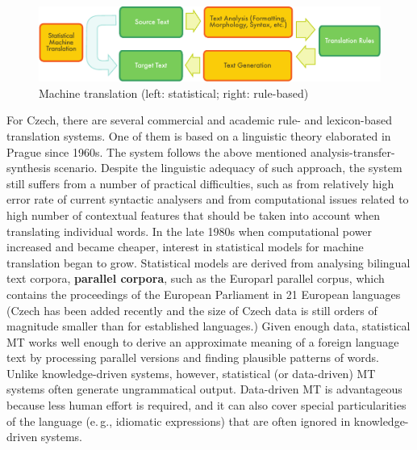\begin{multicols}{2}
\begin{figure}[htb]
  \center
  \includegraphics[width=\textwidth]{../_media/english/machine_translation}
  \caption{Machine translation (left: statistical; right: rule-based)}
\label{fig:mtarch_en}
\end{figure}

For Czech, there are several commercial and academic rule- and lexicon-based translation systems. One of them is based on a linguistic theory elaborated in Prague since 1960s. The system follows the above mentioned analysis-transfer-synthesis scenario. Despite the linguistic adequacy of such approach, the system still suffers from a number of practical difficulties, such as from relatively high error rate of current syntactic analysers and from computational issues related to high number of contextual features that should be taken into account when translating individual words.
In the late 1980s when computational power increased and became cheaper, interest in statistical models for machine translation began to grow. Statistical models are derived from analysing bilingual text corpora, \textbf{parallel corpora}, such as the Europarl parallel corpus, which contains the proceedings of the European Parliament in 21 European languages (Czech has been added recently and the size of Czech data is still orders of magnitude smaller than for established languages.) Given enough data, statistical MT works well enough to derive an approximate meaning of a foreign language text by processing parallel versions and finding plausible patterns of words. Unlike knowledge-driven systems, however, statistical (or data-driven) MT systems often generate ungrammatical output. Data-driven MT is advantageous because less human effort is required, and it can also cover special particularities of the language (e.\,g., idiomatic expressions) that are often ignored in knowledge-driven systems. 

\end{multicols}
